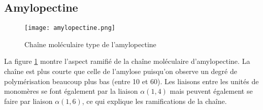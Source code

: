 	\subsection*{Amylopectine}
		\begin{figure}\centering
			\texttt{[image: amylopectine.png]}
			\caption{\label{fig03:amylopectine}Chaîne moléculaire type de l'amylopectine}
		\end{figure}
		La figure \ref{fig03:amylopectine} montre l'aspect ramifié de la chaîne moléculaire d'amylopectine. La chaîne est plus courte que celle de l'amylose puisqu'on observe un degré de polymérisation beaucoup plus bas (entre 10 et 60). Les liaisons entre les unités de monomères se font également par la liaison $\alpha(1,4)$ mais peuvent également se faire par liaison $\alpha(1,6)$, ce qui explique les ramifications de la chaîne.
